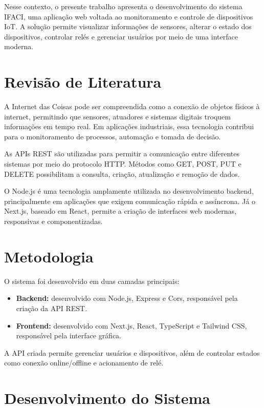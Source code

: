 \documentclass[12pt]{unisenaiclass}
\begin{document}
Nesse contexto, o presente trabalho apresenta o desenvolvimento do sistema IFACI, uma aplicação web voltada ao monitoramento e controle de dispositivos IoT. A solução permite visualizar informações de sensores, alterar o estado dos dispositivos, controlar relés e gerenciar usuários por meio de uma interface moderna.

\section{Revisão de Literatura}

A Internet das Coisas pode ser compreendida como a conexão de objetos físicos à internet, permitindo que sensores, atuadores e sistemas digitais troquem informações em tempo real. Em aplicações industriais, essa tecnologia contribui para o monitoramento de processos, automação e tomada de decisão.

As APIs REST são utilizadas para permitir a comunicação entre diferentes sistemas por meio do protocolo HTTP. Métodos como GET, POST, PUT e DELETE possibilitam a consulta, criação, atualização e remoção de dados.

O Node.js é uma tecnologia amplamente utilizada no desenvolvimento backend, principalmente em aplicações que exigem comunicação rápida e assíncrona. Já o Next.js, baseado em React, permite a criação de interfaces web modernas, responsivas e componentizadas.

\section{Metodologia}

O sistema foi desenvolvido em duas camadas principais:

\begin{itemize}
    \item \textbf{Backend:} desenvolvido com Node.js, Express e Cors, responsável pela criação da API REST.
    \item \textbf{Frontend:} desenvolvido com Next.js, React, TypeScript e Tailwind CSS, responsável pela interface gráfica.
\end{itemize}

A API criada permite gerenciar usuários e dispositivos, além de controlar estados como conexão online/offline e acionamento de relé.

\section{Desenvolvimento do Sistema}
\end{document}
